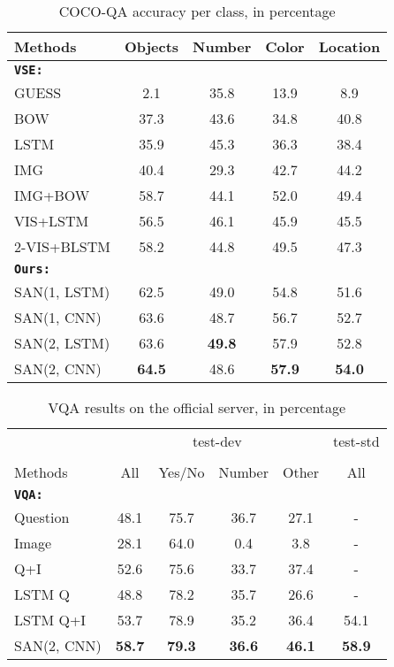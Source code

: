 \documentclass[10pt,twocolumn,letterpaper]{article}
\begin{document}
\begin{table}
      \centering
  \begin{tabular}{l  c  c  c  c}
    \toprule
    Methods & Objects & Number & Color & Location \\
    \midrule
    {\bf\texttt{VSE:}} \cite{ren2015imageqa} \\
    GUESS & 2.1 & 35.8 & 13.9 & 8.9 \\
    BOW & 37.3 & 43.6 & 34.8 & 40.8 \\
    LSTM & 35.9 & 45.3 & 36.3 & 38.4 \\
    IMG & 40.4 & 29.3 & 42.7 & 44.2 \\
    IMG+BOW & 58.7 & 44.1 & 52.0 & 49.4 \\
    VIS+LSTM & 56.5 & 46.1 & 45.9 & 45.5 \\
    2-VIS+BLSTM & 58.2 & 44.8 & 49.5 & 47.3 \\
    \midrule
    {\bf \texttt{Ours:}} \\
    SAN(1, LSTM) & 62.5 & 49.0 & 54.8 & 51.6 \\
    SAN(1, CNN) & 63.6 & 48.7 & 56.7 & 52.7 \\
    SAN(2, LSTM) & 63.6 & {\bf 49.8} & 57.9 & 52.8 \\
    SAN(2, CNN) & {\bf 64.5} & 48.6 & {\bf 57.9} & {\bf 54.0} \\
    \bottomrule
  \end{tabular}
  \caption{COCO-QA accuracy per class, in percentage}
  \label{tab:coco_perclass}
\vspace{-0.5cm}
\end{table}

\begin{table}
  \centering
  \small
  \begin{tabular}{l c c c c c}
    \toprule
    & \multicolumn{4}{c}{test-dev} & test-std \\
    \cline{2-5}\\
    Methods & All & Yes/No & Number & Other & All\\
    \midrule
    {\bf\texttt{VQA:}} \cite{antol2015vqa} \\
    Question & 48.1 & 75.7 & 36.7 & 27.1 & - \\
    Image & 28.1 & 64.0 & 0.4 & 3.8 & -\\
    Q+I & 52.6 & 75.6 & 33.7 & 37.4 & -\\
    LSTM Q & 48.8 & 78.2 & 35.7 & 26.6 & -\\
    LSTM Q+I & 53.7 & 78.9 & 35.2 & 36.4 & 54.1 \\
    \midrule
    SAN(2, CNN) & {\bf 58.7} & {\bf 79.3} & {\bf 36.6} & {\bf 46.1} & {\bf 58.9}\\
    \bottomrule
  \end{tabular}
  \caption{VQA results on the official server, in percentage}
\label{tab:vqa_server}
\vspace{-0.6cm}
\end{table}
\end{document}
